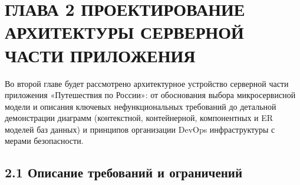\section{ГЛАВА 2 ПРОЕКТИРОВАНИЕ АРХИТЕКТУРЫ СЕРВЕРНОЙ ЧАСТИ ПРИЛОЖЕНИЯ}
Во второй главе будет рассмотрено архитектурное устройство серверной части приложения «Путешествия по России»: от обоснования выбора микросервисной модели и описания ключевых нефункциональных требований до детальной демонстрации диаграмм (контекстной, контейнерной, компонентных и ER моделей баз данных) и принципов организации DevOps инфраструктуры с мерами безопасности.

\subsection*{2.1 Описание требований и ограничений}

